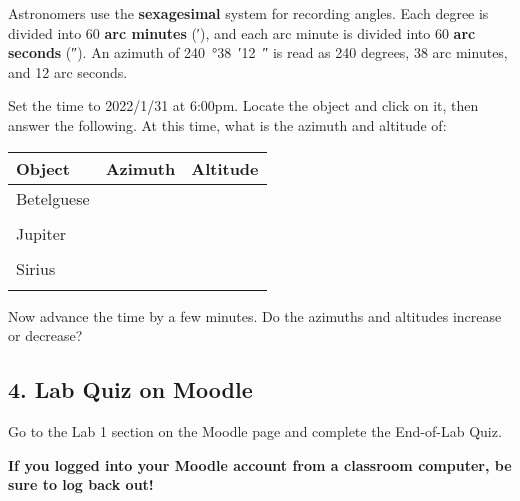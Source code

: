 \documentclass[main.tex]{subfiles}
\begin{document}
Astronomers use the \textbf{sexagesimal} system for recording angles. Each degree is divided into 60 \textbf{arc minutes} (\si{\arcminute}), and each arc minute is divided into 60 \textbf{arc seconds} (\si{\arcsecond}). An azimuth of \SI{240}{\degree}\SI{38}{\arcminute}\SI{12}{\arcsecond} is read as 240 degrees, 38 arc minutes, and 12 arc seconds.

Set the time to 2022/1/31 at 6:00pm. Locate the object and click on it, then answer the following. At this time, what is the azimuth and altitude of: 
\begin{center}
\begin{tabular}{|l|p{5cm}|p{5cm}|}\hline
Object & Azimuth & Altitude \\\hline
Betelguese & & \\
&&\\\hline
Jupiter & & \\
&&\\\hline
Sirius & & \\
&&\\\hline
\end{tabular}
\end{center}
   
Now advance the time by a few minutes. Do the azimuths and altitudes increase or decrease?

\subsection*{4. Lab Quiz on Moodle}
Go to the Lab 1 section on the Moodle page and complete the End-of-Lab Quiz.

\textbf{If you logged into your Moodle account from a classroom computer, be sure to log back out!}
\end{document}
